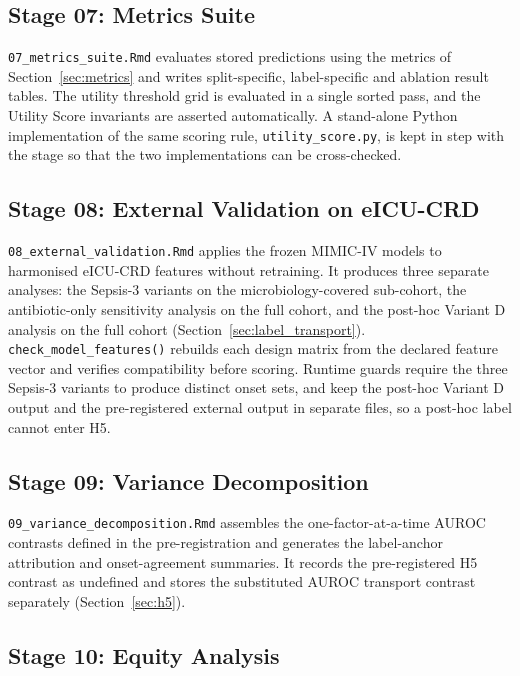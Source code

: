 \subsection{Stage 07: Metrics Suite}

\texttt{07\_metrics\_suite.Rmd} evaluates stored predictions using the metrics
of Section~\ref{sec:metrics} and writes split-specific, label-specific and
ablation result tables. The utility threshold grid is evaluated in a single
sorted pass, and the Utility Score invariants are asserted automatically. A
stand-alone Python implementation of the same scoring rule,
\texttt{utility\_score.py}, is kept in step with the stage so that the two
implementations can be cross-checked.

\subsection{Stage 08: External Validation on eICU-CRD}

\texttt{08\_external\_validation.Rmd} applies the frozen MIMIC-IV models to
harmonised eICU-CRD features without retraining. It produces three separate
analyses: the Sepsis-3 variants on the microbiology-covered sub-cohort, the
antibiotic-only sensitivity analysis on the full cohort, and the post-hoc
Variant D analysis on the full cohort (Section~\ref{sec:label_transport}).
\texttt{check\_model\_features()} rebuilds each design matrix from the declared
feature vector and verifies compatibility before scoring. Runtime guards
require the three Sepsis-3 variants to produce distinct onset sets, and keep
the post-hoc Variant D output and the pre-registered external output in
separate files, so a post-hoc label cannot enter H5.

\subsection{Stage 09: Variance Decomposition}

\texttt{09\_variance\_decomposition.Rmd} assembles the one-factor-at-a-time
AUROC contrasts defined in the pre-registration and generates the label-anchor
attribution and onset-agreement summaries. It records the pre-registered H5
contrast as undefined and stores the substituted AUROC transport contrast
separately (Section~\ref{sec:h5}).

\subsection{Stage 10: Equity Analysis}

